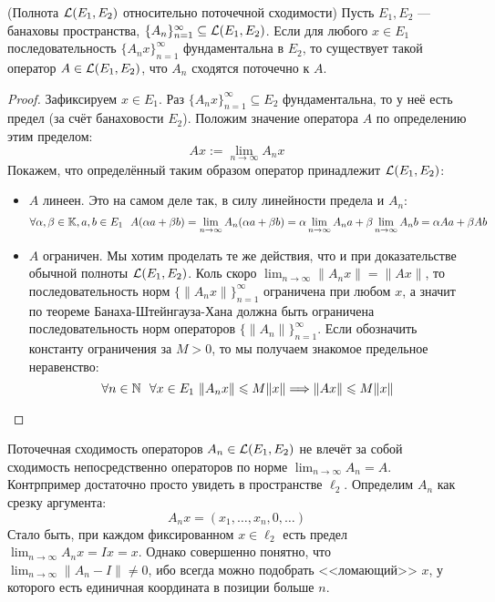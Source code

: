 \begin{theorem} (Полнота $\mathcal{L}(E_1, E_2)$ относительно поточечной сходимости)
	Пусть $E_1, E_2$ --- банаховы пространства, $\{A_n\}_{n = 1}^\infty \subseteq \mathcal{L}(E_1, E_2)$. Если для любого $x \in E_1$ последовательность $\{A_nx\}_{n = 1}^\infty$ фундаментальна в $E_2$, то существует такой оператор $A \in \mathcal{L}(E_1, E_2)$, что $A_n$ сходятся поточечно к $A$.
\end{theorem}

\begin{proof}
	Зафиксируем $x \in E_1$. Раз $\{A_nx\}_{n = 1}^\infty \subseteq E_2$ фундаментальна, то у неё есть предел (за счёт банаховости $E_2$). Положим значение оператора $A$ по определению этим пределом:
	\[
		Ax := \lim_{n \to \infty} A_nx
	\]
	Покажем, что определённый таким образом оператор принадлежит $\mathcal{L}(E_1, E_2)$:
	\begin{itemize}
		\item $A$ линеен. Это на самом деле так, в силу линейности предела и $A_n$:
		\[
			\forall \alpha, \beta \in \K, a, b \in E_1\ \ A(\alpha a + \beta b) = \lim_{n \to \infty} A_n(\alpha a + \beta b) = \alpha \lim_{n \to \infty} A_na + \beta \lim_{n \to \infty} A_nb = \alpha Aa + \beta Ab
		\]
		
		\item $A$ ограничен. Мы хотим проделать те же действия, что и при доказательстве обычной полноты $\mathcal{L}(E_1, E_2)$. Коль скоро $\lim_{n \to \infty} \|A_nx\| = \|Ax\|$, то последовательность норм $\{\|A_nx\|\}_{n = 1}^\infty$ ограничена при любом $x$, а значит по теореме Банаха-Штейнгауза-Хана должна быть ограничена последовательность норм операторов $\{\|A_n\|\}_{n = 1}^\infty$. Если обозначить константу ограничения за $M > 0$, то мы получаем знакомое предельное неравенство:
		\[
			\forall n \in \mathbb{N}\ \ \forall x \in E_1\ \|A_nx\| \leqslant M\|x\| \Longrightarrow \|Ax\| \leqslant M\|x\|
		\]
	\end{itemize}
\end{proof}

\begin{note}
	Поточечная сходимость операторов $A_n \in \mathcal{L}(E_1, E_2)$ не влечёт за собой сходимость непосредственно операторов по норме $\lim_{n \to \infty} A_n = A$. Контрпример достаточно просто увидеть в пространстве $\ell_2$. Определим $A_n$ как срезку аргумента:
	\[
		A_nx = (x_1, \ldots, x_n, 0, \ldots)
	\]
	Стало быть, при каждом фиксированном $x \in \ell_2$ есть предел $\lim_{n \to \infty} A_nx = Ix = x$. Однако совершенно понятно, что $\lim_{n \to \infty} \|A_n - I\| \neq 0$, ибо всегда можно подобрать <<ломающий>> $x$, у которого есть единичная координата в позиции больше $n$.
\end{note}

